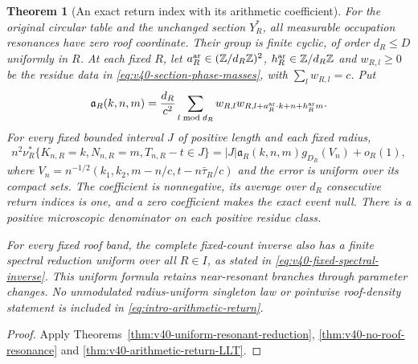 \documentclass[11pt,reqno]{amsart}
\numberwithin{equation}{section}
\newtheorem{leadtheorem}{Theorem}
\theoremstyle{definition}\newtheorem{definition}[theorem]{Definition}
\theoremstyle{remark}\newtheorem{remark}[theorem]{Remark}
\begin{document}
\begin{leadtheorem}[An exact return index with its arithmetic coefficient]
\label{thm:intro-arithmetic-return}
For the original circular table and the unchanged section $Y_R^*$,
all measurable occupation resonances have zero roof coordinate. Their
group is finite cyclic, of order $d_R\le D$ uniformly in $R$. At each
fixed $R$, let $a_R^{\rm ar}\in(\mathbb Z/d_R\mathbb Z)^2$, $h_R^{\rm ar}\in\mathbb Z/d_R\mathbb Z$ and
$w_{R,l}\ge0$ be the residue data in
\eqref{eq:v40-section-phase-masses}, with $\sum_lw_{R,l}=c$.
Put
\[
 \mathfrak a_R(k,n,m)=\frac{d_R}{c^2}
   \sum_{l\bmod d_R}w_{R,l}w_{R,l+a_R^{\rm ar}\cdot k+n+h_R^{\rm ar}m}.
\]
For every fixed bounded interval $J$ of positive length and each
fixed radius,
\begin{equation}\label{eq:intro-arithmetic-return}
 n^2\nu_R^*\{K_{n,R}=k,N_{n,R}=m,T_{n,R}-t\in J\}
   =|J|\mathfrak a_R(k,n,m)g_{D_R}(V_n)+o_R(1),
\end{equation}
where $V_n=n^{-1/2}(k_1,k_2,m-n/c,t-n\bar\tau_R/c)$ and the error
is uniform over its compact sets. The coefficient is nonnegative,
its average over $d_R$ consecutive return indices is one, and a
zero coefficient makes the exact event null. There is a positive
microscopic denominator on each positive residue class.

For every fixed roof band, the complete fixed-count inverse also has
a finite spectral reduction uniform over all $R\in I$, as stated in
\eqref{eq:v40-fixed-spectral-inverse}. This uniform formula retains
near-resonant branches through parameter changes. No unmodulated
radius-uniform singleton law or pointwise roof-density statement is
included in \eqref{eq:intro-arithmetic-return}.
\end{leadtheorem}
\begin{proof}
Apply Theorems~\ref{thm:v40-uniform-resonant-reduction},
\ref{thm:v40-no-roof-resonance} and
\ref{thm:v40-arithmetic-return-LLT}.
\end{proof}
\end{document}
